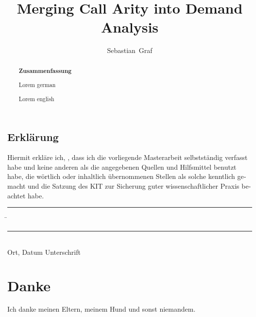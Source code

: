 \documentclass[12pt,a4paper,twoside,headings=openright]{scrreprt}
\title{Merging Call Arity into Demand Analysis}
\author{Sebastian~Graf}
\begin{document}
\begin{otherlanguage}{ngerman} %
\mytitlepage
\end{otherlanguage}

\begin{abstract}
\begin{center}\Huge\textbf{\textsf{Zusammenfassung}}
\end{center}
\vfill

Lorem german
\vfill

Lorem english
\vfill

\end{abstract}

\tableofcontents

%
%

%
%

\printbibliography

\begin{otherlanguage}{ngerman}
\chapter*{Erklärung}
\pagestyle{empty}

  \vspace{20mm}
  Hiermit erkläre ich, \theauthor, dass ich die vorliegende Masterarbeit selbst\-ständig
verfasst habe und keine anderen als die angegebenen Quellen und Hilfsmittel
benutzt habe, die wörtlich oder inhaltlich übernommenen Stellen als solche kenntlich gemacht und
die Satzung des KIT zur Sicherung guter wissenschaftlicher Praxis beachtet habe.
  \vspace{20mm}
  \begin{tabbing}
  \rule{4cm}{.4pt}\hspace{1cm} \= \rule{7cm}{.4pt} \\
 Ort, Datum \> Unterschrift
  \end{tabbing}
\end{otherlanguage}

\chapter*{Danke}
\pagestyle{empty}

Ich danke meinen Eltern, meinem Hund und sonst niemandem.

\pagestyle{fancy}
\appendix

%
\end{document}
